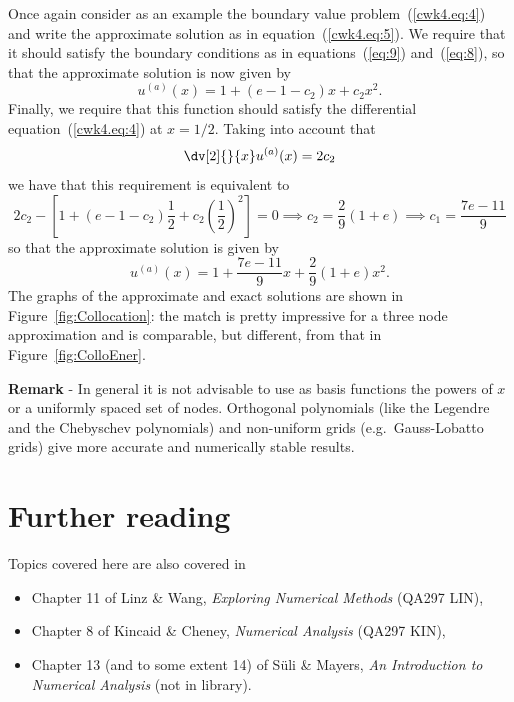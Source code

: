 Once again consider as an example the boundary value
problem~(\ref{cwk4.eq:4}) and write the approximate solution as in
equation~(\ref{cwk4.eq:5}).  We require that it should satisfy the
boundary conditions as in equations~(\ref{eq:9}) and~(\ref{eq:8}), so
that the approximate solution is now given by
%
\begin{equation*}
  u^{(a)}(x) = 1 + (e-1-c_2) x + c_2 x^2 .
\end{equation*}
%
Finally, we require that this function should satisfy the differential
equation~(\ref{cwk4.eq:4}) at $x=1/2$.  Taking into account that
%
\begin{equation*}
 \dv[2]{}{x} u^{(a)}(x) = 2 c_2
\end{equation*}
%
we have that this requirement is equivalent to
%
\begin{equation*}
  2 c_2 - \left [ 1 + (e-1-c_2) \frac{1}{2} +
    c_2 \left ( \frac{1}{2} \right )^2 \right ] = 0 \implies
  c_2 = \frac{2}{9}(1+e) \implies c_1 = \frac{7 e - 11}{9}
\end{equation*}
%
so that the approximate solution is given by
%
\begin{equation}
  u^{(a)}(x) = 1 + \frac{7 e - 11}{9} x + \frac{2}{9}(1+e) x^2 .
  \label{eq:13}
\end{equation}
%
The graphs of the approximate and exact solutions are shown in
Figure~\ref{fig:Collocation}: the match is pretty impressive for a
three node approximation and is comparable, but different, from that
in Figure~\ref{fig:ColloEner}.

\smallskip

\noindent \textbf{Remark} - In general it is not advisable to use as
basis functions the powers of $x$ or a uniformly spaced set of nodes.
Orthogonal polynomials (like the Legendre and the Chebyschev
polynomials) and non-uniform grids (e.g.\ Gauss-Lobatto grids) give
more accurate and numerically stable results.


\section*{Further reading}

Topics covered here are also covered in
\begin{itemize}
\item Chapter 11 of Linz \& Wang, \textit{Exploring Numerical Methods}
  (QA297 LIN),
\item Chapter 8 of Kincaid \& Cheney, \textit{Numerical Analysis}
  (QA297 KIN),
\item Chapter 13 (and to some extent 14) of S{\"u}li \& Mayers,
  \textit{An Introduction to Numerical Analysis} (not in library).
\end{itemize}

